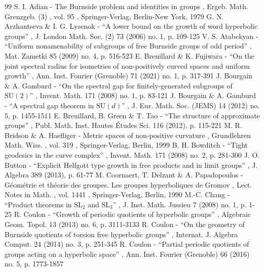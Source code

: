 \documentclass[11pt]{article}
\theoremstyle{plain}
\theoremstyle{definition}
\begin{document}
\begin{thebibliography}{99}
 S. I. Adian - The Burnside problem and identities in groups , Ergeb. Math. Grenzgeb. (3) , vol. 95 , Springer-Verlag, Berlin-New York, 1979
 G. N. Arzhantseva \& I. G. Lysenok - “A lower bound on the growth of word hyperbolic groups” , J. London Math. Soc. (2) 73 (2006) no. 1, p. 109-125
 V. S. Atabekyan - “Uniform nonamenability of subgroups of free Burnside groups of odd period” , Mat. Zametki 85 (2009) no. 4, p. 516-523
 E. Breuillard \& K. Fujiwara - “On the joint spectral radius for isometries of non-positively curved spaces and uniform growth” , Ann. Inst. Fourier (Grenoble) 71 (2021) no. 1, p. 317-391
 J. Bourgain \& A. Gamburd - “On the spectral gap for finitely-generated subgroups of $\mathrm{SU}(2)$” , Invent. Math. 171 (2008) no. 1, p. 83-121
 J. Bourgain \& A. Gamburd - “A spectral gap theorem in $\mathrm{SU}(d)$” , J. Eur. Math. Soc. (JEMS) 14 (2012) no. 5, p. 1455-1511
 E. Breuillard, B. Green \& T. Tao - “The structure of approximate groups” , Publ. Math. Inst. Hautes Études Sci. 116 (2012), p. 115-221
 M. R. Bridson \& A. Haefliger - Metric spaces of non-positive curvature , Grundlehren Math. Wiss. , vol. 319 , Springer-Verlag, Berlin, 1999
 B. H. Bowditch - “Tight geodesics in the curve complex” , Invent. Math. 171 (2008) no. 2, p. 281-300
 J. O. Button - “Explicit Helfgott type growth in free products and in limit groups” , J. Algebra 389 (2013), p. 61-77
 M. Coornaert, T. Delzant \& A. Papadopoulos - Géométrie et théorie des groupes. Les groupes hyperboliques de Gromov , Lect. Notes in Math. , vol. 1441 , Springer-Verlag, Berlin, 1990
 M.-C. Chang - “Product theorems in $\mathrm{SL}_2$ and $\mathrm{SL}_3$” , J. Inst. Math. Jussieu 7 (2008) no. 1, p. 1-25
 R. Coulon - “Growth of periodic quotients of hyperbolic groups” , Algebraic Geom. Topol. 13 (2013) no. 6, p. 3111-3133
 R. Coulon - “On the geometry of Burnside quotients of torsion free hyperbolic groups” , Internat. J. Algebra Comput. 24 (2014) no. 3, p. 251-345
 R. Coulon - “Partial periodic quotients of groups acting on a hyperbolic space” , Ann. Inst. Fourier (Grenoble) 66 (2016) no. 5, p. 1773-1857

\end{thebibliography}
\end{document}
